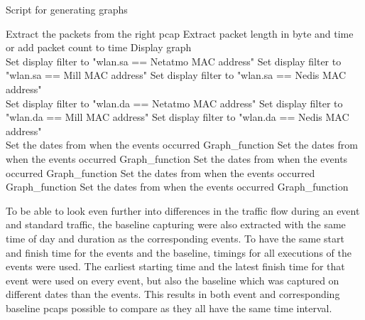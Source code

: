 \begin{algorithm}[H]
\caption{Script for generating graphs}\label{alg:GraphScript}
    \begin{algorithmic}[1]
         
            \State Extract the packets from the right pcap
                \State Extract packet length in byte and time or add packet count to time
                \State Display graph
            \EndFor
        \EndFor {}\\
         
                \State Set display filter to "wlan.sa == Netatmo \gls{MAC} address"
                \State Set display filter to "wlan.sa == Mill \gls{MAC} address"
                \State Set display filter to "wlan.sa == Nedis \gls{MAC} address"    
            \EndIf \\
         
                \State Set display filter to "wlan.da == Netatmo \gls{MAC} address"
                \State Set display filter to "wlan.da == Mill \gls{MAC} address"
                \State Set display filter to "wlan.da == Nedis \gls{MAC} address"  
            \EndIf
        \EndIf \\
         
            \State Set the dates from when the events occurred 
            \State Graph\_function
            \State Set the dates from when the events occurred 
            \State Graph\_function
            \State Set the dates from when the events occurred 
            \State Graph\_function
            \State Set the dates from when the events occurred 
            \State Graph\_function
            \State Set the dates from when the events occurred 
            \State Graph\_function
        \EndIf {}
    \end{algorithmic}
\end{algorithm}

To be able to look even further into differences in the traffic flow during an event and standard traffic, the baseline capturing were also extracted with the same time of day and duration as the corresponding events. To have the same start and finish time for the events and the baseline, timings for all executions of the events were used. The earliest starting time and the latest finish time for that event were used on every event, but also the baseline which was captured on different dates than the events. This results in both event and corresponding baseline pcaps possible to compare as they all have the same time interval. 

